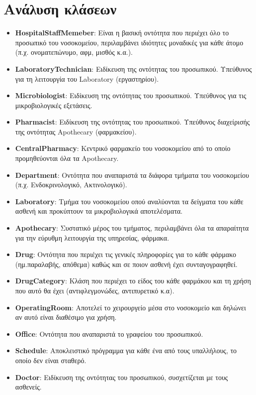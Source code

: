 \documentclass{article}
\begin{document}
\section{Ανάλυση κλάσεων}

\begin{itemize}
    \item \textbf{HospitalStaffMemeber}: Είναι η βασική οντότητα που περιέχει όλο το προσωπικό του νοσοκομείου, περιλαμβάνει ιδιότητες μοναδικές για κάθε άτομο (π.χ. ονοματεπώνυμο, αφμ, μισθός κ.α.).
    \item \textbf{LaboratoryTechnician}: Ειδίκευση της οντότητας του προσωπικού. Υπεύθυνος για τη λειτουργία του Laboratory (εργαστηρίου).
    \item \textbf{Microbiologist}: Ειδίκευση της οντότητας του προσωπικού. Υπεύθυνος για τις μικροβιολογικές εξετάσεις.
    \item \textbf{Pharmacist}: Ειδίκευση της οντότητας του προσωπικού. Υπεύθυνος διαχείρισής της οντότητας Apothecary (φαρμακείου).
    \item \textbf{CentralPharmacy}: Κεντρικό φαρμακείο του νοσοκομείου από το οποίο προμηθεύονται όλα τα Apothecary.
    \item \textbf{Department}: Οντότητα που αναπαριστά τα διάφορα τμήματα του νοσοκομείου (π.χ. Ενδοκρινολογικό, Ακτινολογικό).
    \item \textbf{Laboratory}: Τμήμα του νοσοκομείου οπού αναλύονται τα δείγματα του κάθε ασθενή και προκύπτουν τα μικροβιολογικά αποτελέσματα. 
    \item \textbf{Apothecary}: Συστατικό μέρος του τμήματος, περιλαμβάνει όλα τα απαραίτητα για την εύρυθμη λειτουργία της υπηρεσίας, φάρμακα.
    \item \textbf{Drug}: Οντότητα που περιέχει τις γενικές πληροφορίες για το κάθε φάρμακο (ημ.παραλαβής, απόθεμα) καθώς και σε ποιον ασθενή έχει συνταγογραφηθεί.
    \item \textbf{DrugCategory}: Κλάση που περιέχει το είδος του κάθε φαρμάκου και τη χρήση που αυτό θα έχει (αντιφλεγμονώδες, αντιπυρετικό κ.α).
    \item \textbf{OperatingRoom}: Αποτελεί το χειρουργείο μέσα στο νοσοκομείο και δηλώνει αν αυτό είναι διαθέσιμο για χρήση.
    \item \textbf{Office}: Οντότητα που αναπαριστά το γραφείου του προσωπικού.
    \item \textbf{Schedule}: Αποκλειστικό πρόγραμμα για κάθε ένα από τους υπαλλήλους, το οποίο δεν είναι σταθερό.
    \item \textbf{Doctor}: Ειδίκευση της οντότητας του προσωπικού, συσχετίζεται με τους ασθενείς.

\end{itemize}
\end{document}
